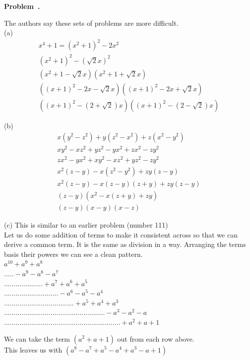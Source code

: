 \documentclass[10pt]{article}
\newcounter{problem}
\newenvironment{problem}[1][]{
  \refstepcounter{problem}
  \par\noindent\textbf{Problem~\theproblem. #1}\par
  \vspace{0.5em}
}{\vspace{1em}}
\begin{document}
\begin{problem} %
  The authors say these sets of problems are more difficult.\\

  (a)
  \begin{gather*}
    x^4 + 1 = (x^2 +1)^2 - 2x^2\\
    (x^2 +1)^2 - (\sqrt{2}x)^2\\
    (x^2 + 1 - \sqrt{2}x)(x^2 + 1 + \sqrt{2}x)\\
    ((x + 1)^2 - 2x - \sqrt{2}x)((x + 1)^2 - 2x + \sqrt{2}x)\\
    ((x + 1)^2 - (2 + \sqrt{2})x)((x + 1)^2 - (2 - \sqrt{2})x)
  \end{gather*}

  (b)
  \begin{gather*}
    x(y^2 - z^2) + y(z^2 - x^2) + z(x^2 - y^2)\\
    xy^2 - xz^2 + yz^2 - yx^2 + zx^2 - zy^2\\
    zx^2 -yx^2 + xy^2 - xz^2 + yz^2 - zy^2\\
    x^2(z - y) - x (z^2 - y^2) + zy(z - y)\\
    x^2(z - y) - x (z - y)(z + y) + zy(z - y)\\
    (z - y)(x^2 - x(z + y) + zy)\\
    (z - y)(x - y)(x - z)
  \end{gather*}

  (c)
  This is similar to an earlier problem (number 111)\\
  Let us do some addition of terms to make it consistent across so that we can derive a common term. It is the same
  as division in a way. Arranging the terms basis their powers we can see a clean pattern.\\

  $a^{10} + a^9 + a^8$\\
  $.....- a^9 - a^8 - a^7$\\
  $.................... + a^7 + a^6 + a^5$\\
  $............................ - a^6 - a^5 - a^4$\\
  $.................................... + a^5 + a^4 + a^3$\\
  $.................................................... - a^3 - a^2 -a$\\
  $............................................................ + a^2 + a + 1$

  We can take the term $(a^2 + a + 1)$ out from each row above.\\
  This leaves us with $(a^8 - a^7 + a^5 - a^4 + a^3 - a + 1)$\\


\end{problem}
\end{document}
